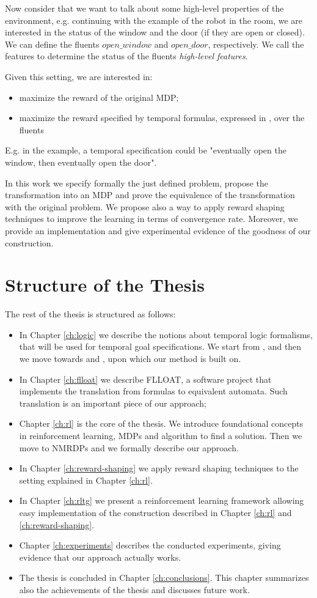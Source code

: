 Now consider that we want to talk about some high-level properties of the environment, e.g. continuing with the example of the robot in the room, we are interested in the status of the window and the door (if they are open or closed). We can define the fluents $open\_window$ and $open\_door$, respectively. We call the features to determine the status of the fluents \emph{high-level features}.

Given this setting, we are interested in:
\begin{itemize}
	\item maximize the reward of the original MDP;
	\item maximize the reward specified by temporal formulas, expressed in \LLf, over the fluents 
\end{itemize}
E.g. in the example, a temporal specification could be "eventually open the window, then eventually open the door". 

In this work we specify formally the just defined problem, propose the transformation into an MDP and prove the equivalence of the transformation with the original problem. We propose also a way to apply reward shaping techniques to improve the learning in terms of convergence rate. Moreover, we provide an implementation and give experimental evidence of the goodness of our construction.

\section{Structure of the Thesis}
The rest of the thesis is structured as follows:
\begin{itemize}
	\item In Chapter \ref{ch:logic} we describe the notions about temporal logic formalisms, that will be used for temporal goal specifications. We start from \LTL, \REGEX and then we move towards \LTLf and \LDLf, upon which our method is built on.
	\item In Chapter \ref{ch:flloat} we describe FLLOAT, a software project that implements the translation from \LLf formulas to equivalent automata. Such translation is an important piece of our approach;
	\item Chapter \ref{ch:rl} is the core of the thesis. We introduce foundational concepts in reinforcement learning, MDPs and algorithm to find a solution. Then we move to NMRDPs and we formally describe our approach.
	\item In Chapter \ref{ch:reward-shaping} we apply reward shaping techniques to the setting explained in Chapter \ref{ch:rl}.
	\item In Chapter \ref{ch:rltg} we present a reinforcement learning framework allowing easy implementation of the construction described in Chapter \ref{ch:rl} and \ref{ch:reward-shaping}.
	\item Chapter \ref{ch:experiments} describes the conducted experiments, giving evidence that our approach actually works.
	\item The thesis is concluded in Chapter \ref{ch:conclusions}. This chapter summarizes also the achievements of
	the thesis and discusses future work.
\end{itemize}
